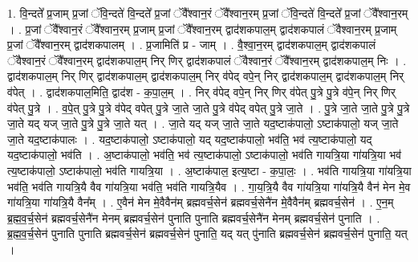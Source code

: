 \documentclass[17pt]{extarticle}
\begin{document}
1. वि॒न्दते᳚ प्र॒जाम् प्र॒जां ॅवि॒न्दते॑ वि॒न्दते᳚ प्र॒जां ॅवै᳚श्वान॒रं ॅवै᳚श्वान॒रम् प्र॒जां ॅवि॒न्दते॑ वि॒न्दते᳚ प्र॒जां ॅवै᳚श्वान॒रम् । . प्र॒जां ॅवै᳚श्वान॒रं ॅवै᳚श्वान॒रम् प्र॒जाम् प्र॒जां ॅवै᳚श्वान॒रम् द्वाद॑शकपाल॒म् द्वाद॑शकपालं ॅवैश्वान॒रम् प्र॒जाम् प्र॒जां ॅवै᳚श्वान॒रम् द्वाद॑शकपालम् । . प्र॒जामिति॑ प्र - जाम् । . वै॒श्वा॒न॒रम् द्वाद॑शकपाल॒म् द्वाद॑शकपालं ॅवैश्वान॒रं ॅवै᳚श्वान॒रम् द्वाद॑शकपाल॒म् निर् णिर् द्वाद॑शकपालं ॅवैश्वान॒रं ॅवै᳚श्वान॒रम् द्वाद॑शकपाल॒म् निः । . द्वाद॑शकपाल॒म् निर् णिर् द्वाद॑शकपाल॒म् द्वाद॑शकपाल॒म् निर् व॑पेद् वपे॒न् निर् द्वाद॑शकपाल॒म् द्वाद॑शकपाल॒म् निर् व॑पेत् । . द्वाद॑शकपाल॒मिति॒ द्वाद॑श - क॒पा॒ल॒म् । . निर् व॑पेद् वपे॒न् निर् णिर् व॑पेत् पु॒त्रे पु॒त्रे व॑पे॒न् निर् णिर् व॑पेत् पु॒त्रे । . व॒पे॒त् पु॒त्रे पु॒त्रे व॑पेद् वपेत् पु॒त्रे जा॒ते जा॒ते पु॒त्रे व॑पेद् वपेत् पु॒त्रे जा॒ते । . पु॒त्रे जा॒ते जा॒ते पु॒त्रे पु॒त्रे जा॒ते यद् यज् जा॒ते पु॒त्रे पु॒त्रे जा॒ते यत् । . जा॒ते यद् यज् जा॒ते जा॒ते यद॒ष्टाक॑पालो॒ ऽष्टाक॑पालो॒ यज् जा॒ते जा॒ते यद॒ष्टाक॑पालः । . यद॒ष्टाक॑पालो॒ ऽष्टाक॑पालो॒ यद् यद॒ष्टाक॑पालो॒ भव॑ति॒ भव॑ त्य॒ष्टाक॑पालो॒ यद् यद॒ष्टाक॑पालो॒ भव॑ति । . अ॒ष्टाक॑पालो॒ भव॑ति॒ भव॑ त्य॒ष्टाक॑पालो॒ ऽष्टाक॑पालो॒ भव॑ति गायत्रि॒या गा॑यत्रि॒या भव॑ त्य॒ष्टाक॑पालो॒ ऽष्टाक॑पालो॒ भव॑ति गायत्रि॒या । . अ॒ष्टाक॑पाल॒ इत्य॒ष्टा - क॒पा॒लः॒ । . भव॑ति गायत्रि॒या गा॑यत्रि॒या भव॑ति॒ भव॑ति गायत्रि॒यै वैव गा॑यत्रि॒या भव॑ति॒ भव॑ति गायत्रि॒यैव । . गा॒य॒त्रि॒यै वैव गा॑यत्रि॒या गा॑यत्रि॒यै वैन॑ मेन मे॒व गा॑यत्रि॒या गा॑यत्रि॒यै वैन᳚म् । . ए॒वैन॑ मेन मे॒वैवैन॑म् ब्रह्मवर्च॒सेन॑ ब्रह्मवर्च॒सेनै॑न मे॒वैवैन॑म् ब्रह्मवर्च॒सेन॑ । . ए॒न॒म् ब्र॒ह्म॒व॒र्च॒सेन॑ ब्रह्मवर्च॒सेनै॑न मेनम् ब्रह्मवर्च॒सेन॑ पुनाति पुनाति ब्रह्मवर्च॒सेनै॑न मेनम् ब्रह्मवर्च॒सेन॑ पुनाति । . ब्र॒ह्म॒व॒र्च॒सेन॑ पुनाति पुनाति ब्रह्मवर्च॒सेन॑ ब्रह्मवर्च॒सेन॑ पुनाति॒ यद् यत् पु॑नाति ब्रह्मवर्च॒सेन॑ ब्रह्मवर्च॒सेन॑ पुनाति॒ यत् । \newline
\end{document}
